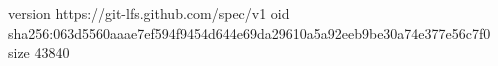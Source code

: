version https://git-lfs.github.com/spec/v1
oid sha256:063d5560aaae7ef594f9454d644e69da29610a5a92eeb9be30a74e377e56c7f0
size 43840
